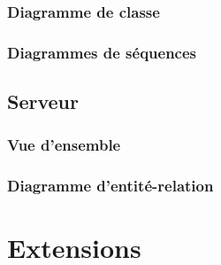 \documentclass[french, a4paper, 12pt]{article}
\begin{document}
		\subsubsection{Diagramme de classe}
		\subsubsection{Diagrammes de séquences}
			
	\subsection{Serveur}
		\subsubsection{Vue d'ensemble}
		
		\subsubsection{Diagramme d'entité-relation}

\section{Extensions}		
\end{document}
